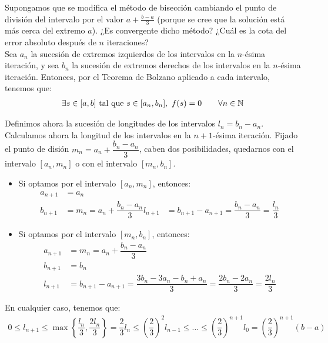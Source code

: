 \begin{ejercicio}\label{ej:1.1.14}
    Supongamos que se modifica el método de bisección cambiando el punto de división del intervalo por el valor $a + \frac{b-a}{3}$ (porque se cree que la solución está más cerca del extremo $a$). ¿Es convergente dicho método? ¿Cuál es la cota del error absoluto después de $n$ iteraciones?\\

    Sea $a_n$ la sucesión de extremos izquierdos de los intervalos en la $n$-ésima iteración, y sea $b_n$ la sucesión de extremos derechos de los intervalos en la $n$-ésima iteración. Entonces, por el Teorema de Bolzano aplicado a cada intervalo, tenemos que:
    \begin{align*}
        \exists s\in [a,b]\text{ tal que } s\in [a_n,b_n],\ f(s)=0\qquad \forall n\in \mathbb{N}
    \end{align*}

    Definimos ahora la sucesión de longitudes de los intervalos $l_n=b_n-a_n$. Calculamos ahora la longitud de los intervalos en la $n+1$-ésima iteración. Fijado el punto de disión $m_n=a_n+\dfrac{b_n-a_n}{3}$, caben dos posibilidades, quedarnos con el intervalo $[a_n,m_n]$ o con el intervalo $[m_n,b_n]$.
    \begin{itemize}
        \item Si optamos por el intervalo $[a_n,m_n]$, entonces:
        \begin{align*}
            a_{n+1}&=a_n\\
            b_{n+1}&=m_n=a_n+\dfrac{b_n-a_n}{3}
            l_{n+1}&=b_{n+1}-a_{n+1}=\dfrac{b_n-a_n}{3} = \dfrac{l_n}{3}
        \end{align*}

        \item Si optamos por el intervalo $[m_n,b_n]$, entonces:
        \begin{align*}
            a_{n+1}&=m_n=a_n+\dfrac{b_n-a_n}{3}\\
            b_{n+1}&=b_n\\
            l_{n+1}&=b_{n+1}-a_{n+1}=\dfrac{3b_n-3a_n-b_n+a_n}{3}=\dfrac{2b_n-2a_n}{3}=\dfrac{2l_n}{3}
        \end{align*}
    \end{itemize}
    
    
    En cualquier caso, tenemos que:
    \begin{align*}
        0\leq l_{n+1}\leq \max\left\{\dfrac{l_n}{3},\dfrac{2l_n}{3}\right\}=\dfrac{2}{3}l_n\leq \left(\dfrac{2}{3}\right)^2 l_{n-1}\leq \ldots \leq \left(\dfrac{2}{3}\right)^{n+1} l_0=\left(\dfrac{2}{3}\right)^{n+1}(b-a)
    \end{align*}


\end{ejercicio}
